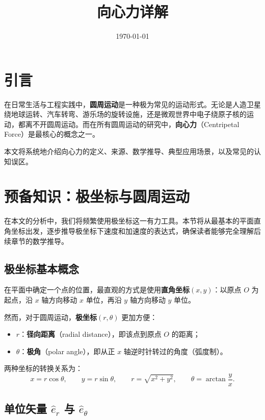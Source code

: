 \documentclass[12pt,a4paper]{article}
\title{\textbf{向心力详解}}
\author{}
\date{\today}
\begin{document}
\maketitle
\thispagestyle{empty}

\section{引言}

在日常生活与工程实践中，\textbf{圆周运动}是一种极为常见的运动形式。无论是人造卫星绕地球运转、汽车转弯、游乐场的旋转设施，还是微观世界中电子绕原子核的运动，都离不开圆周运动。而在所有圆周运动的研究中，\textbf{向心力}（Centripetal Force）是最核心的概念之一。

本文将系统地介绍向心力的定义、来源、数学推导、典型应用场景，以及常见的认知误区。

\section{预备知识：极坐标与圆周运动}

在本文的分析中，我们将频繁使用极坐标这一有力工具。本节将从最基本的平面直角坐标出发，逐步推导极坐标下速度和加速度的表达式，确保读者能够完全理解后续章节的数学推导。

\subsection{极坐标基本概念}

在平面中确定一个点的位置，最直观的方式是使用\textbf{直角坐标}$(x,y)$：以原点 $O$ 为起点，沿 $x$ 轴方向移动 $x$ 单位，再沿 $y$ 轴方向移动 $y$ 单位。

然而，对于圆周运动，\textbf{极坐标}$(r,\theta)$ 更加方便：
\begin{itemize}
  \item $r$：\textbf{径向距离}（radial distance），即该点到原点 $O$ 的距离；
  \item $\theta$：\textbf{极角}（polar angle），即从正 $x$ 轴逆时针转过的角度（弧度制）。
\end{itemize}

两种坐标的转换关系为：
\[
x = r\cos\theta,\qquad y = r\sin\theta,\qquad
r = \sqrt{x^2+y^2},\qquad \theta = \arctan\frac{y}{x}.
\]

\subsection{单位矢量 $\hat{e}_r$ 与 $\hat{e}_\theta$}
\end{document}
